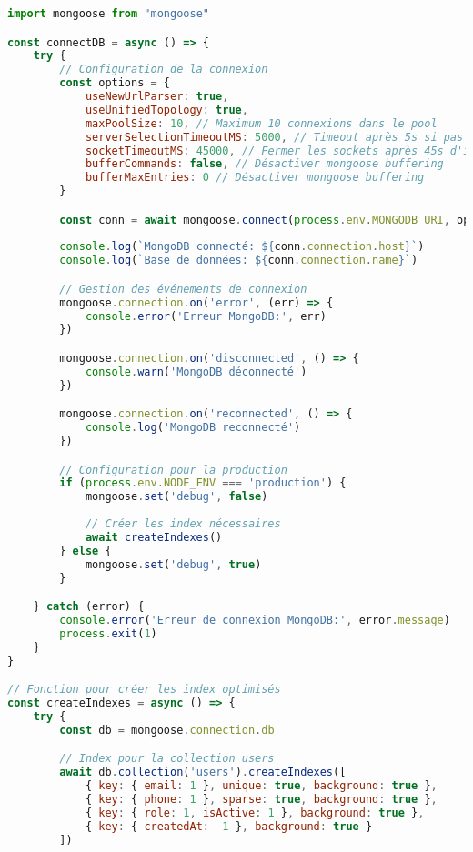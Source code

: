 \begin{lstlisting}[language=JavaScript, caption=mongodb.js - Configuration MongoDB]
import mongoose from "mongoose"

const connectDB = async () => {
    try {
        // Configuration de la connexion
        const options = {
            useNewUrlParser: true,
            useUnifiedTopology: true,
            maxPoolSize: 10, // Maximum 10 connexions dans le pool
            serverSelectionTimeoutMS: 5000, // Timeout après 5s si pas de serveur disponible
            socketTimeoutMS: 45000, // Fermer les sockets après 45s d'inactivité
            bufferCommands: false, // Désactiver mongoose buffering
            bufferMaxEntries: 0 // Désactiver mongoose buffering
        }

        const conn = await mongoose.connect(process.env.MONGODB_URI, options)
        
        console.log(`MongoDB connecté: ${conn.connection.host}`)
        console.log(`Base de données: ${conn.connection.name}`)

        // Gestion des événements de connexion
        mongoose.connection.on('error', (err) => {
            console.error('Erreur MongoDB:', err)
        })

        mongoose.connection.on('disconnected', () => {
            console.warn('MongoDB déconnecté')
        })

        mongoose.connection.on('reconnected', () => {
            console.log('MongoDB reconnecté')
        })

        // Configuration pour la production
        if (process.env.NODE_ENV === 'production') {
            mongoose.set('debug', false)
            
            // Créer les index nécessaires
            await createIndexes()
        } else {
            mongoose.set('debug', true)
        }

    } catch (error) {
        console.error('Erreur de connexion MongoDB:', error.message)
        process.exit(1)
    }
}

// Fonction pour créer les index optimisés
const createIndexes = async () => {
    try {
        const db = mongoose.connection.db

        // Index pour la collection users
        await db.collection('users').createIndexes([
            { key: { email: 1 }, unique: true, background: true },
            { key: { phone: 1 }, sparse: true, background: true },
            { key: { role: 1, isActive: 1 }, background: true },
            { key: { createdAt: -1 }, background: true }
        ])


\end{lstlisting}
